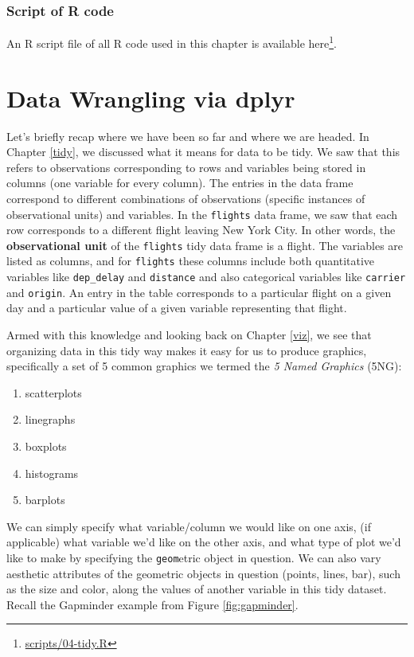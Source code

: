 \documentclass[12pt,]{krantz}
\providecommand{\tightlist}{%
  \setlength{\itemsep}{0pt}\setlength{\parskip}{0pt}}
\renewcommand{\href}[2]{#2\footnote{\url{#1}}}
\begin{document}
\subsection{Script of R code}\label{script-of-r-code-1}

An R script file of all R code used in this chapter is available
\href{scripts/04-tidy.R}{here}.

\chapter{Data Wrangling via dplyr}\label{wrangling}

Let's briefly recap where we have been so far and where we are headed.
In Chapter \ref{tidy}, we discussed what it means for data to be tidy.
We saw that this refers to observations corresponding to rows and
variables being stored in columns (one variable for every column). The
entries in the data frame correspond to different combinations of
observations (specific instances of observational units) and variables.
In the \texttt{flights} data frame, we saw that each row corresponds to
a different flight leaving New York City. In other words, the
\textbf{observational unit} of the \texttt{flights} tidy data frame is a
flight. The variables are listed as columns, and for \texttt{flights}
these columns include both quantitative variables like
\texttt{dep\_delay} and \texttt{distance} and also categorical variables
like \texttt{carrier} and \texttt{origin}. An entry in the table
corresponds to a particular flight on a given day and a particular value
of a given variable representing that flight.

Armed with this knowledge and looking back on Chapter \ref{viz}, we see
that organizing data in this tidy way makes it easy for us to produce
graphics, specifically a set of 5 common graphics we termed the \emph{5
Named Graphics} (5NG):

\begin{enumerate}
\def\labelenumi{\arabic{enumi}.}
\tightlist
\item
  scatterplots
\item
  linegraphs
\item
  boxplots
\item
  histograms
\item
  barplots
\end{enumerate}

We can simply specify what variable/column we would like on one axis,
(if applicable) what variable we'd like on the other axis, and what type
of plot we'd like to make by specifying the \texttt{geom}etric object in
question. We can also vary aesthetic attributes of the geometric objects
in question (points, lines, bar), such as the size and color, along the
values of another variable in this tidy dataset. Recall the Gapminder
example from Figure \ref{fig:gapminder}.
\end{document}
